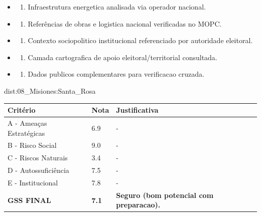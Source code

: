{\begin{itemize}
\item
  \begin{enumerate}
  \def\labelenumi{\arabic{enumi})}
  \setcounter{enumi}{7}
  \tightlist
  \item
    Infraestrutura energetica analisada via operador nacional.
  \end{enumerate}
\item
  \begin{enumerate}
  \def\labelenumi{\arabic{enumi})}
  \setcounter{enumi}{8}
  \tightlist
  \item
    Referências de obras e logistica nacional verificadas no MOPC.
  \end{enumerate}
\item
  \begin{enumerate}
  \def\labelenumi{\arabic{enumi})}
  \setcounter{enumi}{9}
  \tightlist
  \item
    Contexto sociopolitico institucional referenciado por autoridade
    eleitoral.
  \end{enumerate}
\item
  \begin{enumerate}
  \def\labelenumi{\arabic{enumi})}
  \setcounter{enumi}{10}
  \tightlist
  \item
    Camada cartografica de apoio eleitoral/\allowbreak territorial consultada.
  \end{enumerate}
\item
  \begin{enumerate}
  \def\labelenumi{\arabic{enumi})}
  \setcounter{enumi}{11}
  \tightlist
  \item
    Dados publicos complementares para verificacao cruzada.
  \end{enumerate}
\end{itemize}}{dist:08_Misiones:Santa_Rosa}
\begin{table}[ht!]
\small \begin{tabular}{p{3.0cm}p{0.8cm}p{6.0cm}} \toprule
\textbf{Critério} & \textbf{Nota} & \textbf{Justificativa} \\ \midrule
A - Ameaças Estratégicas & 6.9 & - \\
B - Risco Social & 9.0 & - \\
C - Riscos Naturais & 3.4 & - \\
D - Autossuficiência & 7.5 & - \\
E - Institucional & 7.8 & - \\
\midrule \textbf{GSS FINAL} & \textbf{7.1} & \textbf{Seguro (bom potencial com preparacao).} \\ \bottomrule \end{tabular}
\end{table}
